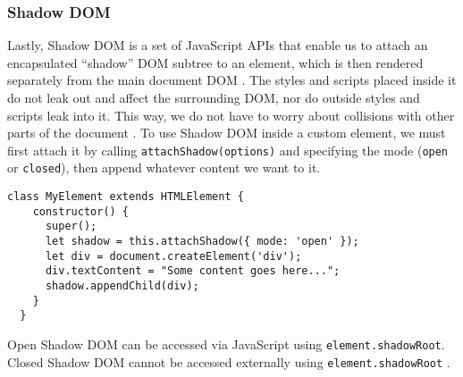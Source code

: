 \subsubsection{Shadow DOM}
Lastly, Shadow DOM is a set of JavaScript APIs that enable us to attach an encapsulated ``shadow'' DOM subtree to an element, which is then rendered separately from the main document DOM \cite{MDNWebComponents}. The styles and scripts placed inside it do not leak out and affect the surrounding DOM, nor do outside styles and scripts leak into it. This way, we do not have to worry about collisions with other parts of the document \cite{EisenbergWebComponents}. To use Shadow DOM inside a custom element, we must first attach it by calling \texttt{attachShadow(options)} and specifying the mode (\texttt{open} or \texttt{closed}), then append whatever content we want to it.
\begin{lstlisting}[caption={Example of using Shadow DOM in a custom element}]
  class MyElement extends HTMLElement {
    constructor() {
      super();
      let shadow = this.attachShadow({ mode: 'open' });
      let div = document.createElement('div');
      div.textContent = "Some content goes here...";
      shadow.appendChild(div);
    }
  }
\end{lstlisting}
Open Shadow DOM can be accessed via JavaScript using \texttt{element.shadowRoot}. Closed Shadow DOM cannot be accessed externally using \texttt{element.shadowRoot} \cite{MDNWebComponents}.

